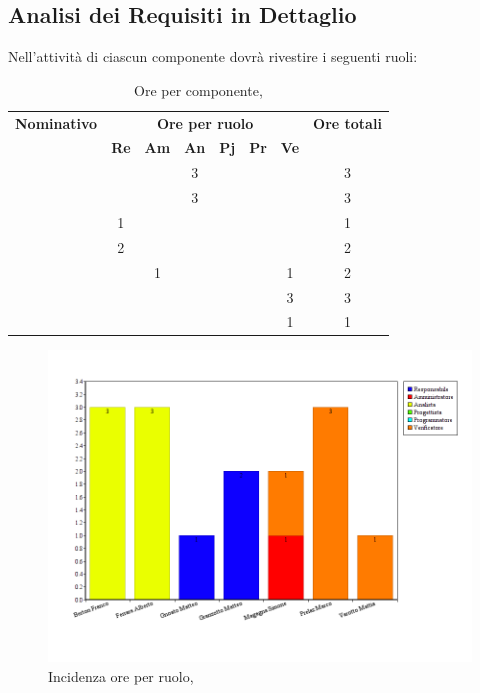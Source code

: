 \subsection{Analisi dei Requisiti in Dettaglio}
Nell'attività di \textit{\AD} ciascun componente dovrà rivestire i seguenti ruoli:

\begin{table}[H]
	\begin{center}
		\begin{tabular}{|c|c|c|c|c|c|c|c|}
			\hline
			\textbf{Nominativo} & \multicolumn{6}{c|}{\textbf{Ore per ruolo}} & \textbf{Ore totali} \\
			& \textbf{Re} & \textbf{Am} & \textbf{An} & \textbf{Pj} & \textbf{Pr} & \textbf{Ve} & \\
			\hline
			\FB	&		&		&	3	&		&		&		&	3	\\
			\hline
			\AF		&		&		&	3	&	 	&		&		& 	3	\\
			\hline
			\GN		&	1	&		&		&		&		&		&	1	\\
			\hline						
			\GR	&	2	&	 	&	 	&		&	 	& 		&	2	\\
			\hline
			\SM 		&		&	1	&		&		&		& 	1	&	2	\\
			\hline
			\MP		& 		&		&		&		&		&	3	&	3	\\
			\hline						
			\MV 		&		&		&		&		&		&	1	& 	1	\\
			\hline
		\end{tabular}
	\end{center}
	\caption{Ore per componente, \AD}
\end{table}

\begin{figure}[H]
	\centering
	\includegraphics[scale=0.4]{immagini/Grafi/GrafoARD}
	\caption{Incidenza ore per ruolo, \AD}
\end{figure}

